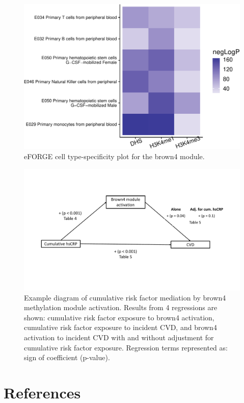 \documentclass[]{article}
\theoremstyle{definition}
\theoremstyle{definition}
\theoremstyle{definition}
\theoremstyle{remark}
\begin{document}
\begin{figure}[htbp]
\centering
\includegraphics{../doc/module_ewas/figures/print-eforge-plots-1.pdf}
\caption{\label{fig:print-eforge-plots}eFORGE cell type-specificity plot for
the brown4 module.}
\end{figure}

\begin{figure}[htbp]
\centering
\includegraphics{../doc/module_ewas/hscrp_mediation_diagram.pdf}
\caption{\label{fig:causal-diagram-hscrp}Example diagram of cumulative risk
factor mediation by brown4 methylation module activation. Results from 4
regressions are shown: cumulative risk factor exposure to brown4
activation, cumulative risk factor exposure to incident CVD, and brown4
activation to incident CVD with and without adjustment for cumulative
risk factor exposure. Regression terms represented as: sign of
coefficient (p-value).}
\end{figure}

\section*{References}\label{references}
\end{document}
